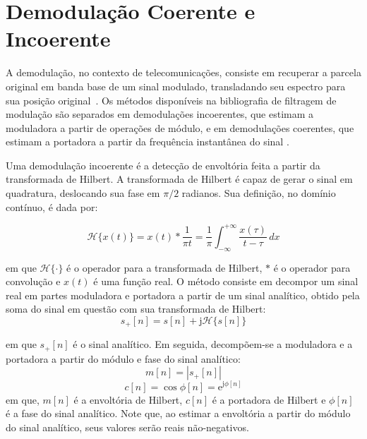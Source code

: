 \section{Demodulação Coerente e Incoerente}
A demodulação, no contexto de telecomunicações, consiste em recuperar a parcela
original em banda base de um sinal modulado, transladando seu espectro para sua
posição original~\cite{lathi2017}. Os métodos disponíveis na bibliografia de
filtragem de modulação são separados em demodulações incoerentes, que estimam a
moduladora a partir de operações de módulo, e em demodulações coerentes, que
estimam a portadora a partir da frequência instantânea do sinal
\cite{clark2009time}.

Uma demodulação incoerente é a detecção de envoltória feita a partir da
transformada de Hilbert. A transformada de Hilbert é capaz de gerar o sinal em
quadratura, deslocando sua fase em $\pi/2$ radianos. Sua definição, no domínio
contínuo, é dada por:

\begin{equation}
    \mathcal{H}\{x(t)\} = x(t) \ast \frac{1}{\pi t} = \frac{1}{\pi} \int_{-\infty}^{+\infty} \frac{x(\tau)}{t - \tau}  \,dx 
\end{equation}

em que $\mathcal{H}\{\cdot\}$ é o operador para a transformada de Hilbert,
$\ast$ é o operador para convolução e $x(t)$ é uma função real. O método
consiste em decompor um sinal real em partes moduladora e portadora a partir de
um sinal analítico, obtido pela soma do sinal em questão com sua transformada de
Hilbert:
\begin{equation}
      s_{+}[n] = s[n] + \mathrm{j}\mathcal{H}\{s[n]\}
\end{equation}

em que $s_{+}[n]$ é o sinal analítico. Em seguida, decompõem-se a moduladora e a
portadora a partir do módulo e fase do sinal analítico:
\begin{equation}  \label{eqn:a_k}
      m[n] = |s_{+}[n]|
\end{equation}
\begin{equation}  \label{eqn:c_k}
      c[n] = \cos \phi[n] = \mathrm{e}^{\mathrm{j} \phi[n]}
\end{equation}
em que, $m[n]$ é a envoltória de Hilbert, $c[n]$ é a portadora de Hilbert e
$\phi[n]$ é a fase do sinal analítico. Note que, ao estimar a envoltória a
partir do módulo do sinal analítico, seus valores serão reais não-negativos.


